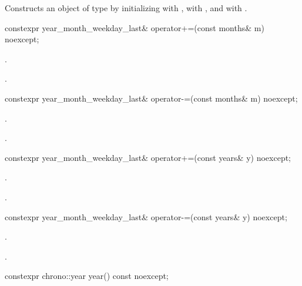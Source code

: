 \begin{itemdescr}
\pnum
\effects
Constructs an object of type  by
initializing  with ,  with , and  with .
\end{itemdescr}

%
\begin{itemdecl}
constexpr year_month_weekday_last& operator+=(const months& m) noexcept;
\end{itemdecl}

\begin{itemdescr}
\pnum
\effects {}.

\pnum
\returns {}.
\end{itemdescr}

%
\begin{itemdecl}
constexpr year_month_weekday_last& operator-=(const months& m) noexcept;
\end{itemdecl}

\begin{itemdescr}
\pnum
\effects {}.

\pnum
\returns {}.
\end{itemdescr}

%
\begin{itemdecl}
constexpr year_month_weekday_last& operator+=(const years& y) noexcept;
\end{itemdecl}

\begin{itemdescr}
\pnum
\effects {}.

\pnum
\returns {}.
\end{itemdescr}

%
\begin{itemdecl}
constexpr year_month_weekday_last& operator-=(const years& y) noexcept;
\end{itemdecl}

\begin{itemdescr}
\pnum
\effects {}.

\pnum
\returns {}.
\end{itemdescr}

%
\begin{itemdecl}
constexpr chrono::year year() const noexcept;
\end{itemdecl}

